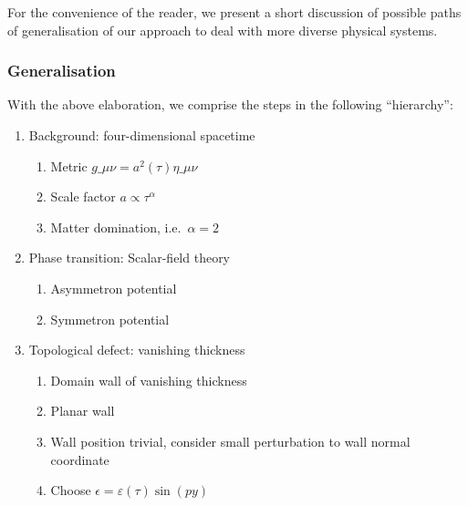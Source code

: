 
For the convenience of the reader, we present a short discussion of possible paths of generalisation of our approach to deal with more diverse physical systems.

\subsubsection{Generalisation}
With the above elaboration, we comprise the steps in the following ``hierarchy'':
\begin{enumerate}
    \item\label{item:whatif:framework:bckg} Background: four-dimensional spacetime %
    \begin{enumerate}
        \item Metric $g\_{\mu\nu}= a^2(\tau)\eta\_{\mu\nu}$ 
        \item\label{item:whatif:framework:bckg_simple_scale_factor} Scale factor $a\propto \tau^\alpha$
        \item\label{item:whatif:framework:bckg_matter_dom} Matter domination, i.e.~$\alpha=2$
    \end{enumerate}
    \item\label{item:whatif:framework:pt}  Phase transition: Scalar-field theory %
        \begin{enumerate}
            \item\label{item:whatif:framework:pt_asymmetron} Asymmetron potential
            \item\label{item:whatif:framework:pt_symmetron}  Symmetron potential
        \end{enumerate}
    \item\label{item:whatif:framework:defect} Topological defect: vanishing thickness %
        \begin{enumerate}
            \item\label{item:whatif:framework:defect_dw} Domain wall of vanishing thickness 
            \item\label{item:whatif:framework:defect_planar} Planar wall
            \item\label{item:whatif:framework:defect_pert} Wall position trivial, consider small perturbation to wall normal coordinate
            \item\label{item:whatif:framework:defect_simple_pert} Choose $\epsilon=\varepsilon(\tau)\sin(py)$
        \end{enumerate}
\end{enumerate}


